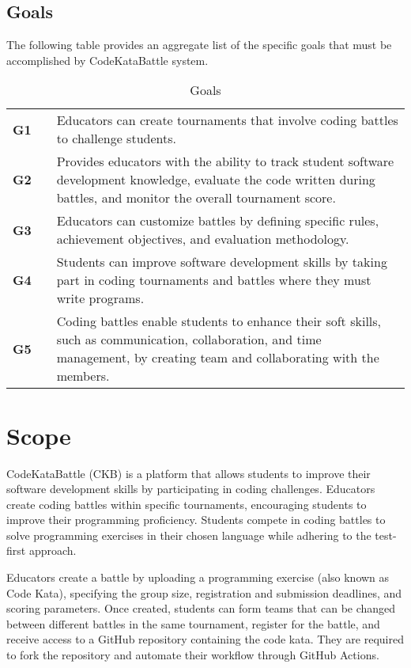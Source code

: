 \subsection{Goals}
The following table provides an aggregate list of the specific goals that must be accomplished by CodeKataBattle system.

\begin{table}[H]
    \centering
    \renewcommand{\arraystretch}{1.5} 
    \begin{tabular}{l l p{12.5cm}}
    \hline
        \textbf{G1} & & Educators can create tournaments that involve coding battles to challenge students. \\                                                                                                
        \textbf{G2} & & Provides educators with the ability to track student software development knowledge, evaluate the code written during battles, and monitor the overall tournament score. \\ 
        \textbf{G3} & & Educators can customize battles by defining specific rules, achievement objectives, and evaluation methodology. \\
        \textbf{G4} & & Students can improve software development skills by taking part in coding tournaments and battles where they must write programs. \\
        \textbf{G5} & & Coding battles enable students to enhance their soft skills, such as communication, collaboration, and time management, by creating team and collaborating with the members. \\
    \hline
    \end{tabular}
    \caption{Goals}
\end{table}

\section{Scope}
CodeKataBattle (CKB) is a platform that allows students to improve their software development skills by participating in coding challenges.
Educators create coding battles within specific tournaments, encouraging students to improve their programming proficiency. 
Students compete in coding battles to solve programming exercises in their chosen language while adhering to the test-first approach.

Educators create a battle by uploading a programming exercise (also known as Code Kata), specifying the group size, registration and submission deadlines, and scoring parameters.
Once created, students can form teams that can be changed between different battles in the same tournament, register for the battle, and receive access to a GitHub repository containing the code kata. 
They are required to fork the repository and automate their workflow through GitHub Actions.

